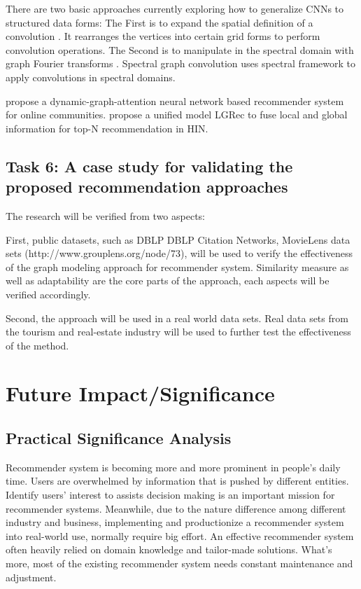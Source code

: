 \documentclass[12pt,a4 paper,title page]{article}
\theoremstyle{definition}
\begin{document}
There are two basic approaches currently exploring how to generalize CNNs to structured data forms: 
The First is to expand the spatial definition of a convolution \citep{niepert2016learning}. It rearranges the vertices into certain grid forms to perform convolution operations. The Second is to manipulate in the spectral domain with graph Fourier transforms \citep{bruna2013spectral}. Spectral graph convolution uses spectral framework to apply convolutions in spectral domains.

\citet{song2019session} propose a dynamic-graph-attention neural network based recommender system for online communities. \citet{Hu2018recommender} propose a unified model LGRec to fuse local and global information for top-N recommendation in HIN.


\subsection{Task 6:  A case study for validating the proposed recommendation approaches}

The research will be verified from two aspects: 

First, public datasets, such as DBLP DBLP Citation Networks, MovieLens data sets (http://www.grouplens.org/node/73), will be used to verify the effectiveness of the graph modeling approach for recommender system. Similarity measure as well as adaptability are the core parts of the approach, each aspects will be verified accordingly. 

Second, the approach will be used in a real world data sets. Real data sets from the tourism and real-estate industry will be used to further test the effectiveness of the method.




\section{Future Impact/Significance}

\subsection{Practical Significance Analysis}
Recommender system is becoming more and more prominent in people's daily time. Users are overwhelmed by information that is pushed by different entities. Identify users' interest to assists decision making is an important mission for recommender systems. Meanwhile, due to the nature difference among different industry and business, implementing and productionize a recommender system into real-world use, normally require big effort. An effective recommender system often heavily relied on domain knowledge and tailor-made solutions. What's more, most of the existing recommender system needs constant maintenance and adjustment.  
\end{document}
